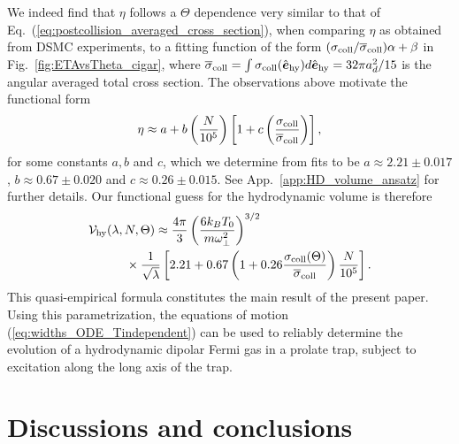 \documentclass[reprint, amsmath, amssymb, aps, superscriptaddress]{revtex4-1}
\begin{document}
We indeed find that $\eta$ follows a $\Theta$ dependence very similar to that of Eq.~(\ref{eq:postcollision_averaged_cross_section}), when comparing $\eta$ as obtained from DSMC experiments, to a fitting function of the form $( \sigma_{\rm coll} / \overline{\sigma}_{\rm coll} ) \alpha + \beta$ in Fig.~\ref{fig:ETAvsTheta_cigar}, where $\overline{\sigma}_{\rm coll} = \int \sigma_{\rm coll}(\hat{\boldsymbol{e}}_{\rm hy}) d\hat{\boldsymbol{e}}_{\rm hy} = { 32 \pi a_d^2 / 15 }$ is the angular averaged total cross section.
The observations above motivate the functional form 
\begin{align} \label{eq:eta_ansatz}
    \eta 
    \approx
    a 
    +
    b 
    \left( \frac{ N }{ 10^5 } \right)
    \left[
    1
    +
    c \left( \frac{ \sigma_{\rm coll} }{ \overline{\sigma}_{\rm coll} } \right)
    \right], 
\end{align}
for some constants $a, b$ and $c$, which we determine from fits to be $a \approx 2.21 \pm 0.017$, $b \approx 0.67 \pm 0.020$ and $c \approx 0.26 \pm 0.015$. 
See App.~\ref{app:HD_volume_ansatz} for further details.  
Our functional guess for the hydrodynamic volume is therefore
\begin{align} \label{eq:hydrodynamic_volume_functional_form}
    & {\cal V}_{\rm hy}( \lambda, N, \Theta )
    \approx
    \frac{ 4 \pi }{ 3 }
    \left(
    \frac{ 6 k_B T_0 }{ m \omega_{\perp}^2 }
    \right)^{3/2} \\
    &\quad\quad\quad \times 
    \frac{ 1 }{ \sqrt{ \lambda } }
    \left[
    2.21
    +  
    0.67
    \left( 
    1 
    +
    0.26
    \frac{ \sigma_{\rm coll}(\Theta) }{ \overline{\sigma}_{\rm coll} } 
    \right)
    \frac{ N }{ 10^5 }
    \right]. \nonumber
\end{align}
This quasi-empirical formula constitutes the main result of the present paper. Using this parametrization, the equations of motion  (\ref{eq:widths_ODE_Tindependent}) can be used to reliably determine the evolution of a hydrodynamic dipolar Fermi gas in a prolate trap, subject to excitation along the long axis of the trap. 








 








\section{ Discussions and conclusions \label{sec:conclusions} }
\end{document}
